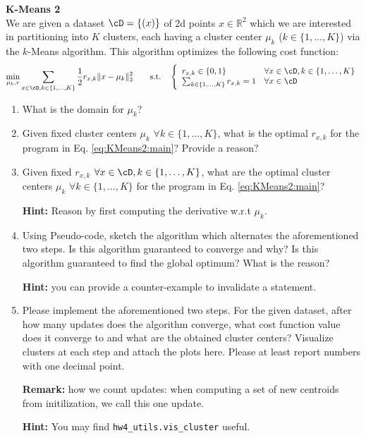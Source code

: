 \begin{Q}
\textbf{\Large K-Means 2}\\

We are given a dataset $\cD = \{(x)\}$ of 2d points $x\in\mathbb{R}^2$ which we are interested in partitioning into $K$ clusters, each having a cluster center $\mu_k$ ($k\in\{1, \ldots, K\}$) via the $k$-Means algorithm. This algorithm optimizes the following cost function:
\begin{equation}
	\min_{\mu_k, r} \sum_{x\in\cD,k\in\{1, \ldots, K\}} \frac{1}{2}r_{x,k}\|x - \mu_k\|_2^2 \quad\quad\text{s.t.}\quad \left\{\begin{array}{ll}
r_{x,k}\in\{0,1\}&\forall x\in\cD,k\in\{1, \ldots, K\}\\
\sum_{k\in\{1, \ldots, K\}} r_{x,k} = 1 & \forall x\in\cD
\end{array}\right.
\label{eq:KMeans2:main}
\end{equation}

\begin{enumerate}

\item What is the domain for $\mu_k$?

\item Given fixed cluster centers $\mu_k$ $\forall k\in\{1, \ldots, K\}$, what is the optimal $r_{x,k}$ for the program in Eq. \ref{eq:KMeans2:main}? Provide a reason?

\item Given fixed $r_{x,k}$ $\forall x\in\cD,k\in\{1, \ldots, K\}$, what are the optimal cluster centers $\mu_k$ $\forall k\in\{1, \ldots, K\}$ for the program in Eq. \ref{eq:KMeans2:main}? 

\textbf{Hint:} Reason by first computing the derivative w.r.t $\mu_k$.

\item Using Pseudo-code, sketch the algorithm which alternates the aforementioned two steps. Is this algorithm guaranteed to converge and why? Is this algorithm guaranteed to find the global optimum? What is the reason?

\textbf{Hint:} you can provide a counter-example to invalidate a statement.

\item Please implement the aforementioned two steps. For the given dataset, after how many updates does the algorithm converge, what cost function value does it converge to and what are the obtained cluster centers? Visualize clusters at each step and attach the plots here. Please at least report numbers with one decimal point.

\textbf{Remark:} how we count updates: when computing a set of new centroids from initilization, we call this one update.

\textbf{Hint:} You may find \texttt{hw4\_utils.vis\_cluster} useful.


\end{enumerate}


\end{Q}
          